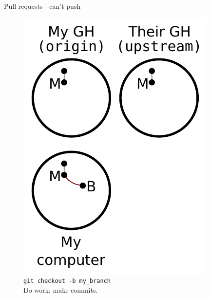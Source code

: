 \begin{frame}{Pull requests---can't push}
  \begin{figure}
    \includegraphics{fork_004.pdf}
    \\ \texttt{git checkout -b my\_branch}
    \\ Do work; make commits.
  \end{figure}
\end{frame}

